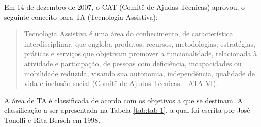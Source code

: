 \documentclass[
	12pt,			%
	openright,		%
	oneside,			%
	a4paper,			%
	chapter=TITLE,		%
	english,			%
	brazil,			%
	]{abntex2}
\begin{document}
Em 14 de dezembro de 2007, o CAT (Comitê de Ajudas Técnicas) aprovou, o seguinte conceito para TA (Tecnologia Assistiva):

\begin{quote}\small\setlength{\leftskip}{4cm}
Tecnologia Assistiva é uma área do conhecimento, de característica interdisciplinar, que engloba produtos, recursos, metodologias, estratégias, práticas e serviços que objetivam promover a funcionalidade, relacionada à atividade e participação, de pessoas com deficiência, incapacidades ou mobilidade reduzida, visando sua autonomia, independência, qualidade de vida e inclusão social (Comitê de Ajudas Técnicas – ATA VI). 
\end{quote}

A área de TA é classificada de acordo com os objetivos a que se destinam. A classificação a ser apresentada na Tabela \ref{tab:tab-1}, a qual foi escrita por José Tonolli e Rita Bersch em 1998.
\end{document}

